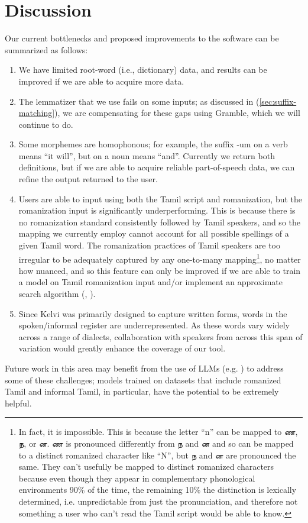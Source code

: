 \documentclass[11pt]{article}
\begin{document}
\section{Discussion}
Our current bottlenecks and proposed improvements to the software can be summarized as follows:
\begin{enumerate}
  \item We have limited root-word (i.e., dictionary) data, and results can be improved if we are able to acquire more data. 
  \item The lemmatizer that we use fails on some inputs; as discussed in (\ref{sec:suffix-matching}), we are compensating for these gaps using Gramble, which we will continue to do. 
  \item Some morphemes are homophonous; for example, the suffix -um on a verb means “it will”, but on a noun means “and”. Currently we return both definitions, but if we are able to acquire reliable part-of-speech data, we can refine the output returned to the user. 
  \item Users are able to input using both the Tamil script and romanization, but the romanization input is significantly underperforming. This is because there is no romanization standard consistently followed by Tamil speakers, and so the mapping we currently employ cannot account for all possible spellings of a given Tamil word. The romanization practices of Tamil speakers are too irregular to be adequately captured by any one-to-many mapping\footnote{In fact, it is impossible. This is because the letter “n” can be mapped to \foreignlanguage{tamil}{ண}, \foreignlanguage{tamil}{ந}, or \foreignlanguage{tamil}{ன}. \foreignlanguage{tamil}{ண} is pronounced differently from \foreignlanguage{tamil}{ந} and \foreignlanguage{tamil}{ன} and so can be mapped to a distinct romanized character like “N”, but \foreignlanguage{tamil}{ந} and \foreignlanguage{tamil}{ன} are pronounced the same. They can’t usefully be mapped to distinct romanized characters because even though they appear in complementary phonological environments 90\% of the time, the remaining 10\% the distinction is lexically determined, i.e. unpredictable from just the pronunciation, and therefore not something a user who can’t read the Tamil script would be able to know.}, no matter how nuanced, and so this feature can only be improved if we are able to train a model on Tamil romanization input and/or implement an approximate search algorithm (\citealp{pine-etal-2025-zero}, \citealp{littell_waldayu_2017}).
  \item Since Kelvi was primarily designed to capture written forms, words in the spoken/informal register are underrepresented. As these words vary widely across a range of dialects, collaboration with speakers from across this span of variation would greatly enhance the coverage of our tool.
\end{enumerate}
Future work in this area may benefit from the use of LLMs (e.g. \citealp{srinivasan-etal-2025-vidai}) to address some of these challenges; models trained on datasets that include romanized Tamil and informal Tamil, in particular, have the potential to be extremely helpful.
\end{document}
